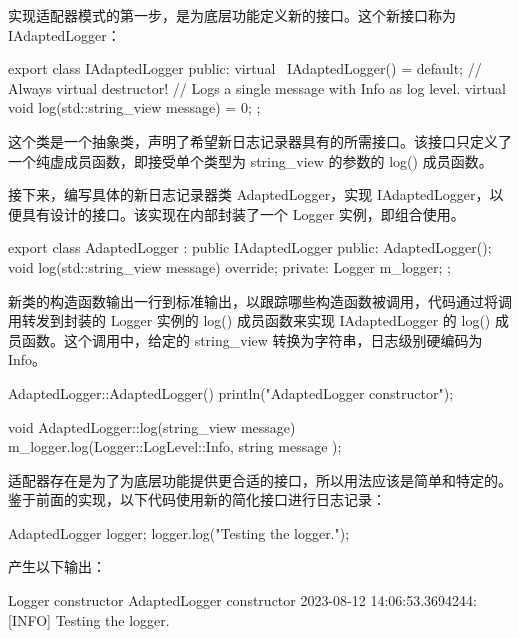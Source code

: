 
实现适配器模式的第一步，是为底层功能定义新的接口。这个新接口称为 IAdaptedLogger：

\begin{cpp}
export class IAdaptedLogger
{
    public:
        virtual ~IAdaptedLogger() = default; // Always virtual destructor!
        // Logs a single message with Info as log level.
        virtual void log(std::string_view message) = 0;
};
\end{cpp}

这个类是一个抽象类，声明了希望新日志记录器具有的所需接口。该接口只定义了一个纯虚成员函数，即接受单个类型为 string\_view 的参数的 log() 成员函数。

接下来，编写具体的新日志记录器类 AdaptedLogger，实现 IAdaptedLogger，以便具有设计的接口。该实现在内部封装了一个 Logger 实例，即组合使用。

\begin{cpp}
export class AdaptedLogger : public IAdaptedLogger
{
    public:
        AdaptedLogger();
        void log(std::string_view message) override;
    private:
        Logger m_logger;
};
\end{cpp}

新类的构造函数输出一行到标准输出，以跟踪哪些构造函数被调用，代码通过将调用转发到封装的 Logger 实例的 log() 成员函数来实现 IAdaptedLogger 的 log() 成员函数。这个调用中，给定的 string\_view 转换为字符串，日志级别硬编码为 Info。

\begin{cpp}
AdaptedLogger::AdaptedLogger() { println("AdaptedLogger constructor"); }

void AdaptedLogger::log(string_view message)
{
    m_logger.log(Logger::LogLevel::Info, string { message });
}
\end{cpp}


适配器存在是为了为底层功能提供更合适的接口，所以用法应该是简单和特定的。鉴于前面的实现，以下代码使用新的简化接口进行日志记录：

\begin{cpp}
AdaptedLogger logger;
logger.log("Testing the logger.");
\end{cpp}

产生以下输出：

\begin{shell}
Logger constructor
AdaptedLogger constructor
2023-08-12 14:06:53.3694244: [INFO] Testing the logger.
\end{shell}











